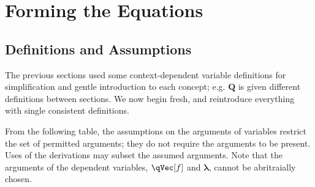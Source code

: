 \documentclass[11pt]{article}
\begin{document}
\clearpage
\section{Forming the Equations} \label{sec:d}
\subsection{Definitions and Assumptions} \label{ssec:d:defs}
The previous sections used some context-dependent variable definitions for simplification and gentle introduction to each concept; e.g. $\mathbf{Q}$ is given different definitions between sections. We now begin fresh, and reintroduce everything with single consistent definitions.

From the following table, the assumptions on the arguments of variables restrict the set of permitted arguments; they do not require the arguments to be present. Uses of the derivations may subset the assumed arguments. Note that the arguments of the dependent variables, $\qVec[f]$ and $\bm{\lambda}$, cannot be abritraially chosen.
\end{document}
